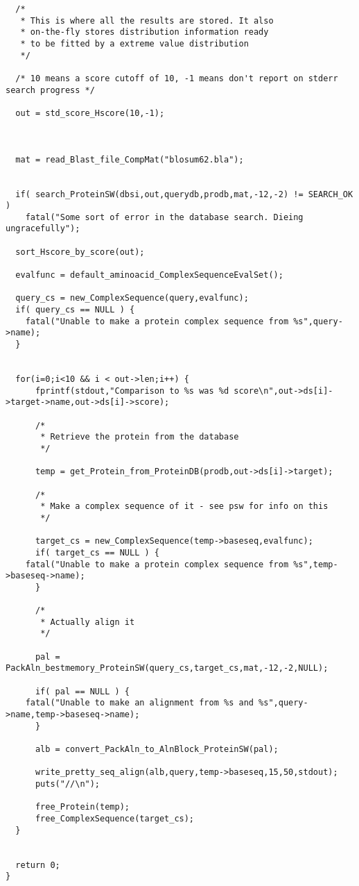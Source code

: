 \begin{verbatim}
  /*
   * This is where all the results are stored. It also
   * on-the-fly stores distribution information ready
   * to be fitted by a extreme value distribution
   */
  
  /* 10 means a score cutoff of 10, -1 means don't report on stderr search progress */

  out = std_score_Hscore(10,-1);

    
  
  mat = read_Blast_file_CompMat("blosum62.bla");
  

  if( search_ProteinSW(dbsi,out,querydb,prodb,mat,-12,-2) != SEARCH_OK ) 
    fatal("Some sort of error in the database search. Dieing ungracefully");

  sort_Hscore_by_score(out);

  evalfunc = default_aminoacid_ComplexSequenceEvalSet();
  
  query_cs = new_ComplexSequence(query,evalfunc);
  if( query_cs == NULL ) {
    fatal("Unable to make a protein complex sequence from %s",query->name);
  }
  

  for(i=0;i<10 && i < out->len;i++) {
      fprintf(stdout,"Comparison to %s was %d score\n",out->ds[i]->target->name,out->ds[i]->score);

      /*
       * Retrieve the protein from the database
       */

      temp = get_Protein_from_ProteinDB(prodb,out->ds[i]->target);

      /*
       * Make a complex sequence of it - see psw for info on this
       */

      target_cs = new_ComplexSequence(temp->baseseq,evalfunc);
      if( target_cs == NULL ) {
	fatal("Unable to make a protein complex sequence from %s",temp->baseseq->name);
      }

      /*
       * Actually align it
       */

      pal = PackAln_bestmemory_ProteinSW(query_cs,target_cs,mat,-12,-2,NULL);
      
      if( pal == NULL ) {
	fatal("Unable to make an alignment from %s and %s",query->name,temp->baseseq->name);
      }
      
      alb = convert_PackAln_to_AlnBlock_ProteinSW(pal);

      write_pretty_seq_align(alb,query,temp->baseseq,15,50,stdout);
      puts("//\n");

      free_Protein(temp);
      free_ComplexSequence(target_cs);
  }
      

  return 0;
}
  
\end{verbatim}


